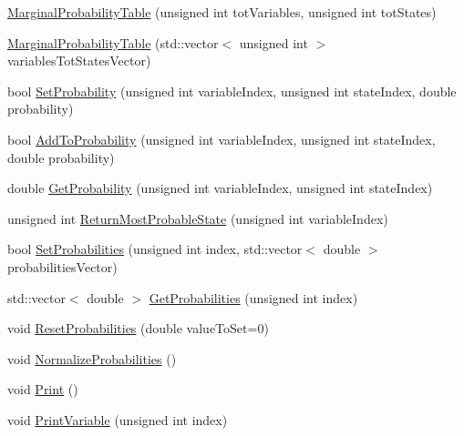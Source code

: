 \begin{DoxyCompactItemize}
\item 
\hyperlink{classbayonet_1_1_marginal_probability_table_aaf7f15ab1f5ed12d53722cb66b6eeed8}{Marginal\-Probability\-Table} (unsigned int tot\-Variables, unsigned int tot\-States)
\item 
\hyperlink{classbayonet_1_1_marginal_probability_table_aafec778bc82a3e6abb0ad05bd4fa6710}{Marginal\-Probability\-Table} (std\-::vector$<$ unsigned int $>$ variables\-Tot\-States\-Vector)
\item 
bool \hyperlink{classbayonet_1_1_marginal_probability_table_a2e5df9bbbc655d522199b4b87e4d46e3}{Set\-Probability} (unsigned int variable\-Index, unsigned int state\-Index, double probability)
\item 
bool \hyperlink{classbayonet_1_1_marginal_probability_table_afd29b47bc1be02bf329612d0b4586372}{Add\-To\-Probability} (unsigned int variable\-Index, unsigned int state\-Index, double probability)
\item 
double \hyperlink{classbayonet_1_1_marginal_probability_table_a5447f68ac26b7adadc801de7c1f5ffa7}{Get\-Probability} (unsigned int variable\-Index, unsigned int state\-Index)
\item 
unsigned int \hyperlink{classbayonet_1_1_marginal_probability_table_aeaac086b73fe3d950ceb19ba755a9778}{Return\-Most\-Probable\-State} (unsigned int variable\-Index)
\item 
bool \hyperlink{classbayonet_1_1_marginal_probability_table_a0bdf638395853225660615a0a847c741}{Set\-Probabilities} (unsigned int index, std\-::vector$<$ double $>$ probabilities\-Vector)
\item 
std\-::vector$<$ double $>$ \hyperlink{classbayonet_1_1_marginal_probability_table_aa97aabef18b97cdea29e0b74a5372d2e}{Get\-Probabilities} (unsigned int index)
\item 
void \hyperlink{classbayonet_1_1_marginal_probability_table_af344153e4331262849efaab2e15da74f}{Reset\-Probabilities} (double value\-To\-Set=0)
\item 
void \hyperlink{classbayonet_1_1_marginal_probability_table_ae8761dbcf404325640572f806809c9b4}{Normalize\-Probabilities} ()
\item 
void \hyperlink{classbayonet_1_1_marginal_probability_table_aca70cba427a713917d194b182e38ceb4}{Print} ()
\item 
void \hyperlink{classbayonet_1_1_marginal_probability_table_ac0d3f11940b2377eca44e9076d8de0ad}{Print\-Variable} (unsigned int index)
\end{DoxyCompactItemize}


